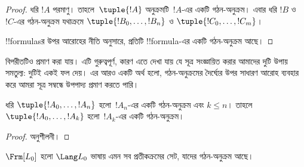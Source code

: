 \documentclass[../../../include/open-logic-section]{subfiles}
\begin{document}
\begin{proof}
ধরি $!A$ পরমাণু। তাহলে~$\tuple{!A}$ অনুক্রমটি~$!A$-এর একটি
গঠন-অনুক্রম।
%
এবার ধরি $!B$ ও~$!C$-এর গঠন-অনুক্রম যথাক্রমে
$\tuple{!B_0,\dotsc,!B_n}$ ও $\tuple{!C_0,\dotsc,!C_m}$।
%
\begin{enumerate}
\end{enumerate}
!!{formula}sর উপর আরোহের নীতি অনুসারে, প্রতিটি !!{formula}-এর একটি
গঠন-অনুক্রম আছে।
\end{proof}

বিপরীতটিও প্রমাণ করা যায়। এটি গুরুত্বপূর্ণ, কারণ এতে দেখা যায় যে
সূত্র সংজ্ঞায়িত করার আমাদের দুটি উপায় সমতুল্য: দুটিই একই ফল দেয়।
এর আরও একটি অর্থ হলো, গঠন-অনুক্রমের দৈর্ঘ্যের উপর সাধারণ আরোহ ব্যবহার
করে আমরা সূত্র সম্বন্ধে উপপাদ্য প্রমাণ করতে পারি।

\begin{lem}
ধরি $\tuple{!A_0,\dotsc,!A_n}$ হলো~$!A_n$-এর একটি গঠন-অনুক্রম এবং
$k \leq n$। তাহলে $\tuple{!A_0,\dotsc,!A_k}$ হলো~$!A_k$-এর একটি
গঠন-অনুক্রম।
\end{lem}

\begin{proof}
অনুশীলনী।
\end{proof}

\begin{thm}
$\Frm[L_0]$ হলো $\Lang L_0$ ভাষায় এমন সব প্রতীকক্রমের সেট,
যাদের গঠন-অনুক্রম আছে।
\end{thm}
\end{document}
